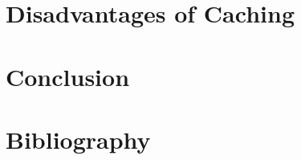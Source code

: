 \documentclass[a4paper,12pt]{article}
\begin{document}
\newpage
\section{Disadvantages of Caching}


\newpage
\section{Conclusion}


\newpage
\renewcommand\refname{\vskip -1cm}
\section{Bibliography}

\nocite{hwu:procon}
\nocite{MPEGDASH}
\nocite{citrix:caching}
\nocite{OnlineVideoBandwagon}
\nocite{ats:caching}
\nocite{expandedramblings:stats}
\nocite{techopedia:weighing}


\end{document}
